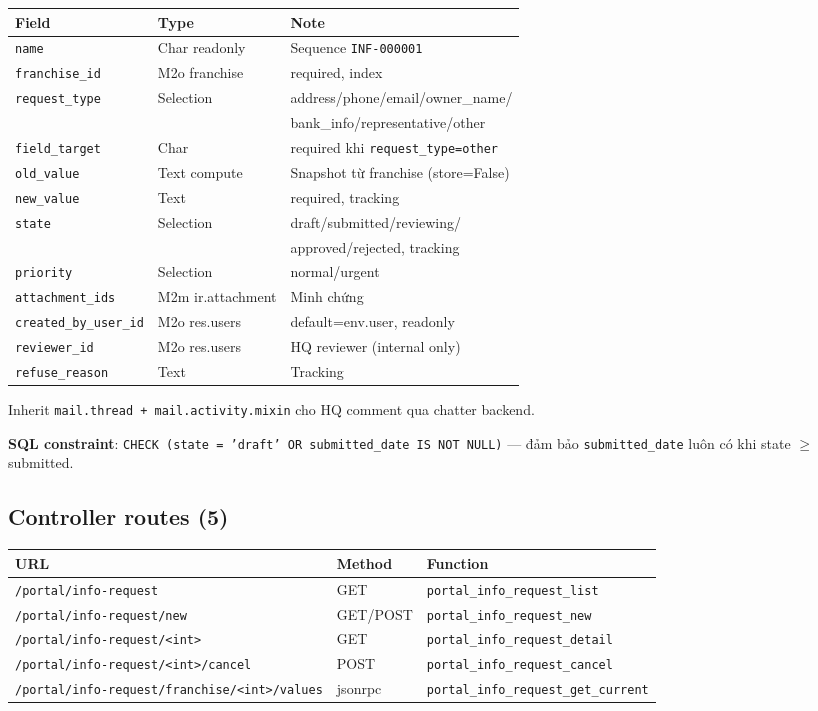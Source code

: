\begin{tabular}{lll}
\toprule
\textbf{Field} & \textbf{Type} & \textbf{Note} \\
\midrule
\texttt{name} & Char readonly & Sequence \texttt{INF-000001} \\
\texttt{franchise\_id} & M2o franchise & required, index \\
\texttt{request\_type} & Selection & address/phone/email/owner\_name/ \\
 & & bank\_info/representative/other \\
\texttt{field\_target} & Char & required khi \texttt{request\_type=other} \\
\texttt{old\_value} & Text compute & Snapshot từ franchise (store=False) \\
\texttt{new\_value} & Text & required, tracking \\
\texttt{state} & Selection & draft/submitted/reviewing/ \\
 & & approved/rejected, tracking \\
\texttt{priority} & Selection & normal/urgent \\
\texttt{attachment\_ids} & M2m ir.attachment & Minh chứng \\
\texttt{created\_by\_user\_id} & M2o res.users & default=env.user, readonly \\
\texttt{reviewer\_id} & M2o res.users & HQ reviewer (internal only) \\
\texttt{refuse\_reason} & Text & Tracking \\
\bottomrule
\end{tabular}

Inherit \texttt{mail.thread + mail.activity.mixin} cho HQ comment qua chatter backend.

\textbf{SQL constraint}: \texttt{CHECK (state = 'draft' OR submitted\_date IS NOT NULL)} --- đảm bảo \texttt{submitted\_date} luôn có khi state $\geq$ submitted.

\subsection{Controller routes (5)}

\begin{tabular}{lll}
\toprule
\textbf{URL} & \textbf{Method} & \textbf{Function} \\
\midrule
\texttt{/portal/info-request} & GET & \texttt{portal\_info\_request\_list} \\
\texttt{/portal/info-request/new} & GET/POST & \texttt{portal\_info\_request\_new} \\
\texttt{/portal/info-request/<int>} & GET & \texttt{portal\_info\_request\_detail} \\
\texttt{/portal/info-request/<int>/cancel} & POST & \texttt{portal\_info\_request\_cancel} \\
\texttt{/portal/info-request/franchise/<int>/values} & jsonrpc & \texttt{portal\_info\_request\_get\_current} \\
\bottomrule
\end{tabular}

